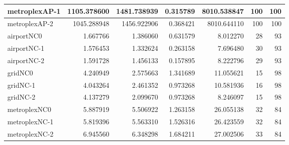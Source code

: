 \begin{longtable}{|l|r|r|r|r|r|r|}
metroplexAP-1 & 1105.378600 & 1481.738939 & 0.315789 & 8010.538847 & 100 & 100 \\ \hline
metroplexAP-2 & 1045.288948 & 1456.922906 & 0.368421 & 8010.644110 & 100 & 100 \\ \hline
airportNC0 & 1.667766 & 1.386060 & 0.631579 & 8.012270 & 28 & 93 \\ \hline
airportNC-1 & 1.576453 & 1.332624 & 0.263158 & 7.696480 & 30 & 93 \\ \hline
airportNC-2 & 1.591728 & 1.456133 & 0.157895 & 8.222796 & 29 & 93 \\ \hline
gridNC0 & 4.240949 & 2.575663 & 1.341689 & 11.055621 & 15 & 98 \\ \hline
gridNC-1 & 4.043264 & 2.461352 & 0.973268 & 10.581936 & 16 & 98 \\ \hline
gridNC-2 & 4.137279 & 2.099670 & 0.973268 & 8.246097 & 15 & 98 \\ \hline
metroplexNC0 & 5.887919 & 5.506922 & 1.263158 & 26.055138 & 32 & 84 \\ \hline
metroplexNC-1 & 5.819396 & 5.563310 & 1.526316 & 26.423559 & 32 & 84 \\ \hline
metroplexNC-2 & 6.945560 & 6.348298 & 1.684211 & 27.002506 & 33 & 84 \\ \hline
\end{longtable}
